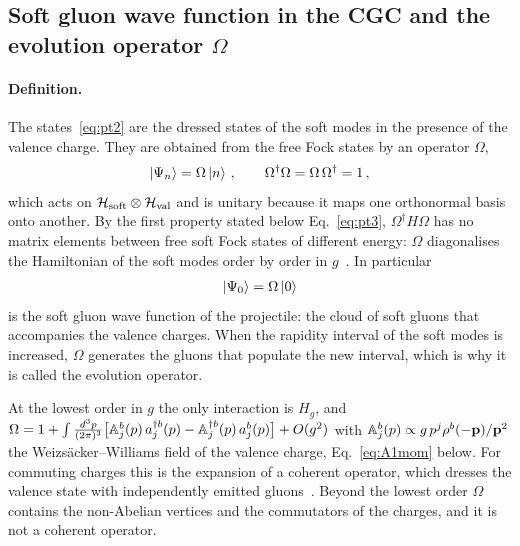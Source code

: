 \subsection{Soft gluon wave function in the CGC and the evolution operator \texorpdfstring{$\Omega$}{Omega}}\label{sec:omega_def}

\paragraph{Definition.} The states~\eqref{eq:pt2} are the dressed states of the soft modes in the presence of the valence charge. They are obtained from the free Fock states by an operator $\Omega$,
\begin{align}\label{eq:Omegadef}
\ket{\Psi_n}=\Omega\ket n\,,\qquad \Omega^\dagger\Omega=\Omega\,\Omega^\dagger=1\,,
\end{align}
which acts on $\mathcal H_{\rm soft}\otimes\mathcal H_{\rm val}$ and is unitary because it maps one orthonormal basis onto another. By the first property stated below Eq.~\eqref{eq:pt3}, $\Omega^\dagger H\Omega$ has no matrix elements between free soft Fock states of different energy: $\Omega$ diagonalises the Hamiltonian of the soft modes order by order in $g$~\cite{Kovner:2005en,Radhakrishnan:2026soft}. In particular
\begin{align}
\ket{\Psi_0}=\Omega\ket0
\end{align}
is the soft gluon wave function of the projectile: the cloud of soft gluons that accompanies the valence charges. When the rapidity interval of the soft modes is increased, $\Omega$ generates the gluons that populate the new interval, which is why it is called the evolution operator.

At the lowest order in $g$ the only interaction is $H_g$, and $\Omega=1+\int\frac{d^3p}{(2\pi)^3}\big[\mathbb{A}^b_j(p)\,a^{\dagger b}_j(p)-\mathbb{A}^{\dagger b}_j(p)\,a^b_j(p)\big]+O(g^2)$ with $\mathbb{A}^b_j(p)\propto g\,p^j\rho^b(-\mathbf{p})/\mathbf{p}^2$ the Weizs\"acker--Williams field of the valence charge, Eq.~\eqref{eq:A1mom} below. For commuting charges this is the expansion of a coherent operator, which dresses the valence state with independently emitted gluons~\cite{Kovner:2005en}. Beyond the lowest order $\Omega$ contains the non-Abelian vertices and the commutators of the charges, and it is not a coherent operator.

